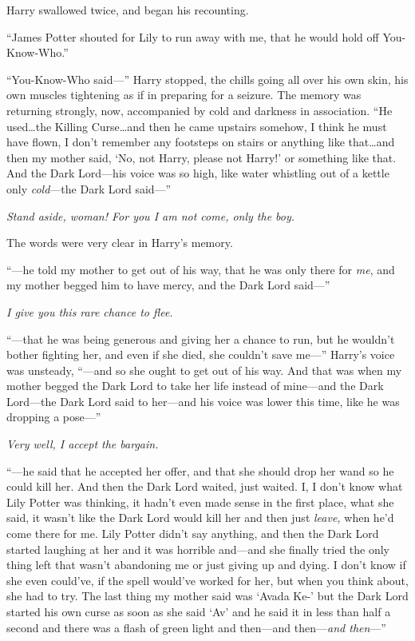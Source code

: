 Harry swallowed twice, and began his recounting.

“James Potter shouted for Lily to run away with me, that he would hold off You-Know-Who.”

“You-Know-Who said—” Harry stopped, the chills going all over his own skin, his own muscles tightening as if in preparing for a seizure. The memory was returning strongly, now, accompanied by cold and darkness in association. “He used…the Killing Curse…and then he came upstairs somehow, I think he must have flown, I don’t remember any footsteps on stairs or anything like that…and then my mother said, ‘No, not Harry, please not Harry!’ or something like that. And the Dark Lord—his voice was so high, like water whistling out of a kettle only \emph{cold}—the Dark Lord said—”

\emph{Stand aside, woman! For you I am not come, only the boy.}

The words were very clear in Harry’s memory.

“—he told my mother to get out of his way, that he was only there for \emph{me}, and my mother begged him to have mercy, and the Dark Lord said—”

\emph{I give you this rare chance to flee.}

“—that he was being generous and giving her a chance to run, but he wouldn’t bother fighting her, and even if she died, she couldn’t save me—” Harry’s voice was unsteady, “—and so she ought to get out of his way. And that was when my mother begged the Dark Lord to take her life instead of mine—and the Dark Lord—the Dark Lord said to her—and his voice was lower this time, like he was dropping a pose—”

\emph{Very well, I accept the bargain.}

“—he said that he accepted her offer, and that she should drop her wand so he could kill her. And then the Dark Lord waited, just waited. I, I don’t know what Lily Potter was thinking, it hadn’t even made sense in the first place, what she said, it wasn’t like the Dark Lord would kill her and then just \emph{leave,} when he’d come there for me. Lily Potter didn’t say anything, and then the Dark Lord started laughing at her and it was horrible and—and she finally tried the only thing left that wasn’t abandoning me or just giving up and dying. I don’t know if she even could’ve, if the spell would’ve worked for her, but when you think about, she had to try. The last thing my mother said was ‘Avada Ke-’ but the Dark Lord started his own curse as soon as she said ‘Av’ and he said it in less than half a second and there was a flash of green light and then—and then—\emph{and then}—”

